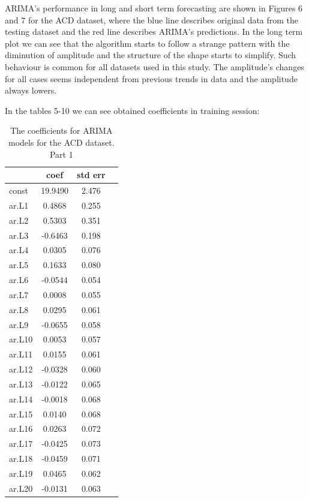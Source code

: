 \documentclass[12pt,a4paper]{article}
\theoremstyle{myplain}
\numberwithin{equation}{section}
\begin{document}
ARIMA's performance in long and short term forecasting are shown in Figures 6 and 7 for the ACD dataset, where the blue line describes original data from the testing dataset and the red line describes ARIMA's predictions. In the long term plot we can see that the algorithm starts to follow a strange pattern with the diminution of amplitude and the structure of the shape starts to simplify. Such behaviour is common for all datasets used in this study. The amplitude's changes for all cases seems independent from previous trends in data and the amplitude always lowers.

In the tables 5-10 we can see obtained coefficients in training session:

\newpage

\begin{table}[h!]
\label{tab:table5}
\begin{center}
\begin{tabular}{|l|c|c|c|}
\hline
 & coef  &  std err \\
\hline
const     &    19.9490    &  2.476 \\
\hline
ar.L1     &     0.4868    &  0.255 \\
\hline
ar.L2     &     0.5303   &   0.351 \\
\hline
ar.L3     &    -0.6463    &  0.198 \\
\hline
ar.L4     &     0.0305    &  0.076 \\
\hline
ar.L5     &     0.1633   &   0.080 \\
\hline
ar.L6     &    -0.0544  &    0.054 \\
\hline
ar.L7     &    0.0008  &    0.055 \\
\hline
ar.L8     &     0.0295     & 0.061 \\
\hline
ar.L9     &    -0.0655    &  0.058 \\
\hline
ar.L10    &    0.0053   &   0.057 \\
\hline
ar.L11    &     0.0155 &     0.061 \\
\hline
ar.L12    &    -0.0328     & 0.060 \\
\hline
ar.L13    &    -0.0122    &  0.065 \\
\hline
ar.L14    &     -0.0018  &    0.068 \\
\hline
ar.L15    &    0.0140   &   0.068 \\
\hline
ar.L16    &    0.0263  &    0.072 \\
\hline
ar.L17    &     -0.0425  &    0.073 \\
\hline
ar.L18    &    -0.0459  &    0.071 \\
\hline
ar.L19    &    0.0465  &    0.062 \\
\hline
ar.L20    &    -0.0131   &   0.063 \\
\hline
\end{tabular}
\end{center}
\caption{The coefficients for ARIMA models for the ACD dataset. Part 1}
\end{table}
\end{document}
